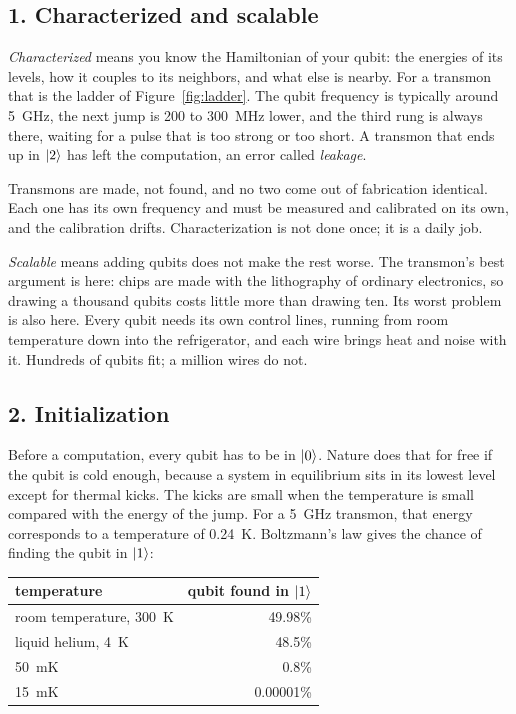 \subsection*{1. Characterized and scalable}

\emph{Characterized} means you know the Hamiltonian of your qubit: the energies of its
levels, how it couples to its neighbors, and what else is nearby. For a transmon that is
the ladder of Figure~\ref{fig:ladder}. The qubit frequency is typically around 5~GHz,
the next jump is 200 to 300~MHz lower, and the third rung is always there, waiting for
a pulse that is too strong or too short. A transmon that ends up in $\ket2$ has left the
computation, an error called \emph{leakage}.

Transmons are made, not found, and no two come out of fabrication identical. Each one
has its own frequency and must be measured and calibrated on its own, and the
calibration drifts. Characterization is not done once; it is a daily job.

\emph{Scalable} means adding qubits does not make the rest worse. The transmon's best
argument is here: chips are made with the lithography of ordinary electronics, so
drawing a thousand qubits costs little more than drawing ten. Its worst problem is also
here. Every qubit needs its own control lines, running from room temperature down into
the refrigerator, and each wire brings heat and noise with it. Hundreds of qubits fit;
a million wires do not.

\subsection*{2. Initialization}

Before a computation, every qubit has to be in $\ket0$. Nature does that for free if
the qubit is cold enough, because a system in equilibrium sits in its lowest level
except for thermal kicks. The kicks are small when the temperature is small compared
with the energy of the jump. For a 5~GHz transmon, that energy corresponds to a
temperature of 0.24~K. Boltzmann's law gives the chance of finding the qubit in $\ket1$:

\begin{center}
\begin{tabular}{lr}
\hline
temperature & qubit found in $\ket1$ \\
\hline
room temperature, 300~K & 49.98\% \\
liquid helium, 4~K & 48.5\% \\
50~mK & 0.8\% \\
15~mK & 0.00001\% \\
\hline
\end{tabular}
\end{center}


